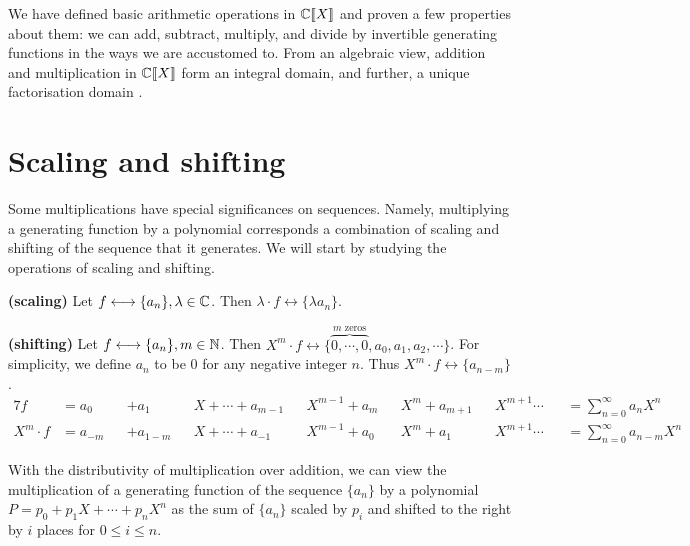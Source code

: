 \documentclass[a4paper, 12pt]{report}
\begin{document}
We have defined basic arithmetic operations in $\mathbb{C}\llbracket X\rrbracket$ and proven a few properties about them: we can add, subtract, multiply, and divide by invertible generating functions in the ways we are accustomed to. From an algebraic view, addition and multiplication in $\mathbb{C}\llbracket X\rrbracket$ form an integral domain, and further, a unique factorisation domain \autocite[873]{niven}.

\section{Scaling and shifting}
Some multiplications have special significances on sequences. Namely, multiplying a generating function by a polynomial corresponds a combination of scaling and shifting of the sequence that it generates. We will start by studying the operations of scaling and shifting.

\begin{rem}\label{rem:gf-scaling}
\textbf{(scaling)} Let $f \longleftrightarrow \{a_n\}, \lambda \in \mathbb{C}$. Then $\lambda \cdot f \longleftrightarrow \{\lambda a_n\}$.
\end{rem}

\begin{rem}\label{rem:gf-shifting}
\textbf{(shifting)} Let $f \longleftrightarrow \{a_n\}, m \in \mathbb{N}$. Then $X^m \cdot f \longleftrightarrow \{\overbrace{0, \cdots, 0}^{m\text{ zeros}}, a_0, a_1, a_2, \cdots\}$. For simplicity, we define $a_{n}$ to be $0$ for any negative integer $n$. Thus $X^m \cdot f \longleftrightarrow \{a_{n - m}\}$.
\begin{alignat*}{7}
    f &= a_0 &&+ a_1 &&X + \cdots + a_{m - 1} &&X^{m - 1} + a_m &&X^m + a_{m + 1} &&X^{m + 1} \cdots &&= \sum\nolimits_{n = 0}^\infty a_n X^n\\
    X^m \cdot f &= a_{-m} &&+ a_{1 - m}&&X + \cdots + a_{-1} &&X^{m - 1} + a_0 &&X^m + a_1 &&X^{m + 1}\cdots &&= \sum\nolimits_{n = 0}^\infty a_{n - m} X^n
\end{alignat*}
\end{rem}

With the distributivity of multiplication over addition, we can view the multiplication of a generating function of the sequence $\{a_n\}$ by a polynomial $P = p_0 + p_1 X + \cdots + p_n X^n$ as the sum of $\{a_n\}$ scaled by $p_i$ and shifted to the right by $i$ places for $0 \leq i \leq n$.
\end{document}
